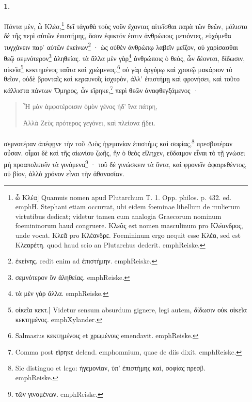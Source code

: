 \documentclass[a4paper, 11pt, oneside, polutonikogreek, german]{article}
\begin{document}
\paragraph{1.}
Πάντα μὲν, ὦ Κλέα,\footnote{ὦ Κλέα] Quamuis nomen apud Plutarchum T. 1. Opp. philos. p. 432. ed. emph{H. Stephani} etiam occurrat, ubi eidem foeminae libellum de mulierum virtutibus dedicat; videtur tamen cum analogia Graecorum nominum foemininorum haud congruere. Κλεᾶς est nomen masculinum pro Κλέανδρος, unde vocat. Κλεᾶ pro Κλέανδρε. Foemininum ergo nequit esse Κλέα, sed est Κλεαρέτη. quod haud scio an Plutarchus dederit. emph{Reiske.}} δεῖ τἀγαθὰ τοὺς νοῦν ἔχοντας αἰτεῖσθαι παρὰ τῶν θεῶν, μάλιστα δὲ τῆς περὶ αὐτῶν ἐπιστήμης, ὅσον ἐφικτόν ἐστιν ἀνθρώποις μετιόντες, εὐχόμεθα τυγχάνειν παρ' αὐτῶν ἐκείνων\footnote{ἐκείνης. redit enim ad ἐπιστήμην. emph{Reiske.}} · ὡς οὐθὲν ἀνθρώπῳ λαβεῖν μεῖζον, οὐ χαρίσασθαι θεῷ σεμνότερον\footnote{σεμνότερον ὂν ἀληθείας. emph{Reiske.}} ἀληθείας. τὰ ἄλλα μὲν γὰρ\footnote{τὰ μὲν γὰρ ἄλλα. emph{Reiske.}} ἀνθρώποις ὁ θεὸς, ὧν δέονται, δίδωσιν, οἰκεῖα\footnote{οἰκεῖα κεκτ.] Videtur sensum absurdum gignere, legi autem, δίδωσιν οὐκ οἰκεῖα κεκτημένος. emph{Xylander.}} κεκτημένος ταῦτα καὶ χρώμενος.\footnote{Salmasius κεκτημένοις et χρωμένοις emendavit. emph{Reiske.}} οὐ γὰρ ἀργύρῳ καὶ χρυσῷ μακάριον τὸ θεῖον, οὐδὲ βρονταῖς καὶ κεραυνοῖς ἰσχυρὸν, ἀλλ' ἐπιστήμῃ καὶ φρονήσει, καὶ τοῦτο κάλλιστα πάντων Ὅμηρος, ὧν εἴρηκε,\footnote{Comma post εἴρηκε delend. emph{omnium, quae de diis dixit.} emph{Reiske.}} περὶ θεῶν ἀναφθεγξάμενος ·
\begin{quotation}
Ἦ μὰν ἀμφοτέροισιν ὁμὸν γένος ἠδ' ἴνα πάτρη,

Ἀλλὰ Ζεὺς πρότερος γεγόνει, καὶ πλείονα ᾔδει.
\end{quotation}
\paragraph{}
σεμνοτέραν ἀπέφῃνε τὴν τοῦ Διὸς ἡγεμονίαν ἐπιστήμς καὶ σοφίας,\footnote{Sic distinguo et lego: ἡγεμονίαν, ὑπ' ἐπιστήμης καὶ, σοφίας πρεσβ. emph{Reiske.}} πρεσβυτέραν οὖσαν. οἶμαι δὲ καὶ τῆς αἰωνίου ζωῆς, ἣν ὁ θεὸς εἴληχεν, εὔδαιμον εἶναι τὸ τῇ γνώσει μὴ προαπολιπεῖν τὰ γινόμενα\footnote{τῶν γινομένων. emph{Reiske.}} · τοῦ δὲ γινώσκειν τὰ ὄντα, καὶ φρονεῖν ἀφαιρεθέντος, οὐ βίον, ἀλλὰ χρόνον εἶναι τὴν ἀθανασίαν.
\end{document}
